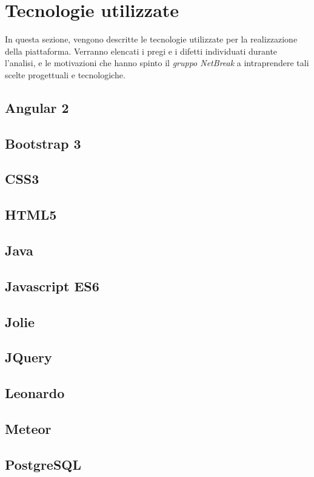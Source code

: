 \newpage
\section{Tecnologie utilizzate}
In questa sezione, vengono descritte le tecnologie utilizzate per la realizzazione della piattaforma. Verranno elencati i pregi e i difetti individuati durante l'analisi, e le motivazioni che hanno spinto il \textit{gruppo NetBreak} a intraprendere tali scelte progettuali e tecnologiche.

\subsection{Angular 2}

\subsection{Bootstrap 3}

\subsection{CSS3}

\subsection{HTML5}

\subsection{Java}

\subsection{Javascript ES6}

\subsection{Jolie}

\subsection{JQuery}

\subsection{Leonardo}

\subsection{Meteor}

\subsection{PostgreSQL}



